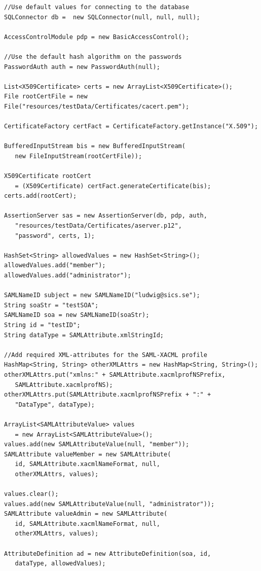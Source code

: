 \documentclass[10pt,a4paper]{article}
\begin{document}
\begin{verbatim}
//Use default values for connecting to the database
SQLConnector db =  new SQLConnector(null, null, null);

AccessControlModule pdp = new BasicAccessControl();

//Use the default hash algorithm on the passwords
PasswordAuth auth = new PasswordAuth(null);
	
List<X509Certificate> certs = new ArrayList<X509Certificate>();
File rootCertFile = new File("resources/testData/Certificates/cacert.pem");

CertificateFactory certFact = CertificateFactory.getInstance("X.509");
               
BufferedInputStream bis = new BufferedInputStream(
   new FileInputStream(rootCertFile));
        
X509Certificate rootCert 
   = (X509Certificate) certFact.generateCertificate(bis);
certs.add(rootCert);
        
AssertionServer sas = new AssertionServer(db, pdp, auth,
   "resources/testData/Certificates/aserver.p12",
   "password", certs, 1);
		
HashSet<String> allowedValues = new HashSet<String>();
allowedValues.add("member");
allowedValues.add("administrator");
		
SAMLNameID subject = new SAMLNameID("ludwig@sics.se");
String soaStr = "testSOA";
SAMLNameID soa = new SAMLNameID(soaStr);
String id = "testID";
String dataType = SAMLAttribute.xmlStringId;

//Add required XML-attributes for the SAML-XACML profile
HashMap<String, String> otherXMLAttrs = new HashMap<String, String>();
otherXMLAttrs.put("xmlns:" + SAMLAttribute.xacmlprofNSPrefix, 
   SAMLAttribute.xacmlprofNS);
otherXMLAttrs.put(SAMLAttribute.xacmlprofNSPrefix + ":" +
   "DataType", dataType);

ArrayList<SAMLAttributeValue> values
   = new ArrayList<SAMLAttributeValue>();
values.add(new SAMLAttributeValue(null, "member"));
SAMLAttribute valueMember = new SAMLAttribute(
   id, SAMLAttribute.xacmlNameFormat, null, 
   otherXMLAttrs, values);

values.clear();
values.add(new SAMLAttributeValue(null, "administrator"));
SAMLAttribute valueAdmin = new SAMLAttribute(
   id, SAMLAttribute.xacmlNameFormat, null, 
   otherXMLAttrs, values);

AttributeDefinition ad = new AttributeDefinition(soa, id, 
   dataType, allowedValues);
		

\end{verbatim}
\end{document}
